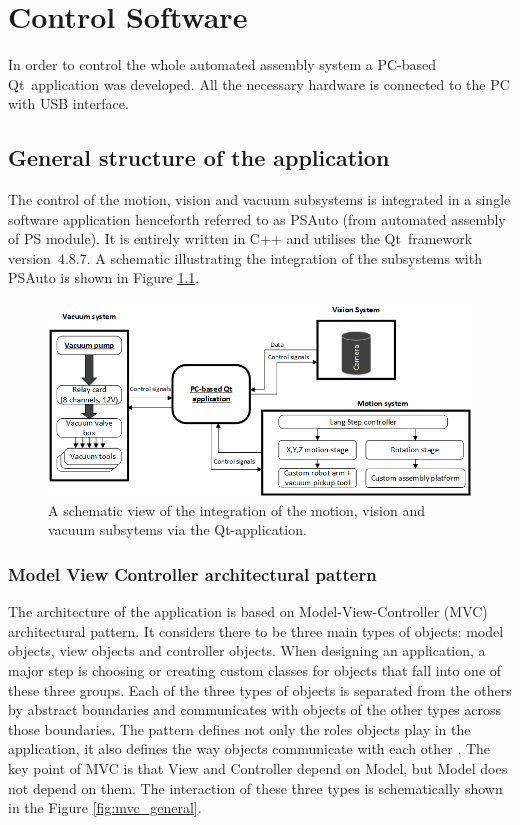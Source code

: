 \chapter{Control Software}

In order to control the whole automated assembly system a PC-based Qt~application was developed. All the necessary hardware is connected to the PC with USB interface.

\section{General structure of the application}

The control of the motion, vision and vacuum subsystems is integrated in a single software application henceforth referred to as PSAuto (from automated assembly of PS module). It is entirely written in C++ and utilises the Qt~framework version~4.8.7. A schematic illustrating the integration of the subsystems with PSAuto is shown in Figure \ref{fig:general_app_structure}.

\begin{figure}[ht]\centering
\includegraphics[width=1\linewidth]{Data/Control_Software/Whole_system_diagram_(English).png}
\caption{A schematic view of the integration of the motion, vision and vacuum subsytems via the Qt-application.}
\label{fig:general_app_structure}
\end{figure}



\subsection{Model View Controller architectural pattern}

The architecture of the application is based on Model-View-Controller (MVC) architectural pattern. It considers there to be three main types of objects: model objects, view objects and controller objects. When designing an application, a major step is choosing or creating custom classes for objects that fall into one of these three groups. Each of the three types of objects is separated from the others by abstract boundaries and communicates with objects of the other types across those boundaries. The pattern defines not only the roles objects play in the application, it also defines the way objects communicate with each other \cite{apple_MVC}. The key point of MVC is that View and Controller depend on Model, but Model does not depend on them. The  interaction of these three types is schematically shown in the Figure \ref{fig:mvc_general}.

